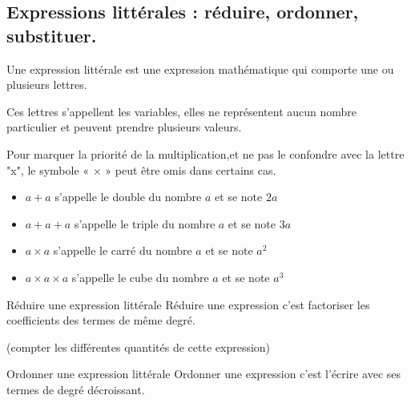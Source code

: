 
\begin{pageCours} %


\section{Expressions littérales : réduire, ordonner, substituer.}

\begin{Def}
Une expression littérale est une expression mathématique qui comporte une ou plusieurs lettres.

Ces lettres s'appellent les variables, elles ne représentent aucun nombre particulier et peuvent prendre plusieurs valeurs.
\end{Def}

\begin{Pp}
Pour marquer la priorité de la multiplication,et ne pas le confondre avec la lettre "x",  le symbole « $\times$ » peut être omis dans certains cas.
\end{Pp}

\begin{Def}
\begin{itemize}
\item $a+a$ s'appelle le double du nombre $a$ et se note $2a$
\item $a+a+a$ s'appelle le triple du nombre $a$ et se note $3a$
\item $a\times a$ s'appelle le carré du nombre $a$ et se note $a^2$
\item $a\times a\times a$ s'appelle le cube du nombre $a$ et se note $a^3$
\end{itemize}
\end{Def}

\begin{DefT}{Réduire une expression littérale}
Réduire une expression c'est factoriser les coefficients des termes de même degré.

(compter les différentes quantités de cette expression)
\end{DefT}

\begin{DefT}{Ordonner une expression littérale}
Ordonner une expression c'est l'écrire avec ses termes de degré décroissant.
\end{DefT}


\end{pageCours}
